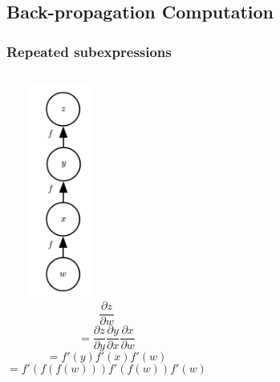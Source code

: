 \documentclass{beamer}
\begin{document}
\subsection{Back-propagation Computation}
\begin{frame}
	\frametitle{Repeated subexpressions}
	\begin{columns}
		\centering
		\includegraphics[height= 7cm, width = 3.5cm]{repeated_sub_exp.png}
		$$ \frac{\partial z}{\partial w}$$
		$$ = \frac{\partial z}{\partial y} \frac{\partial y}{\partial x} \frac{\partial x}{\partial w}  $$
		$$ = f'(y)f'(x)f'(w)$$
		$$ = f'(f(f(w)))f'(f(w))f'(w)$$
	\end{columns}

\end{frame}
\end{document}
